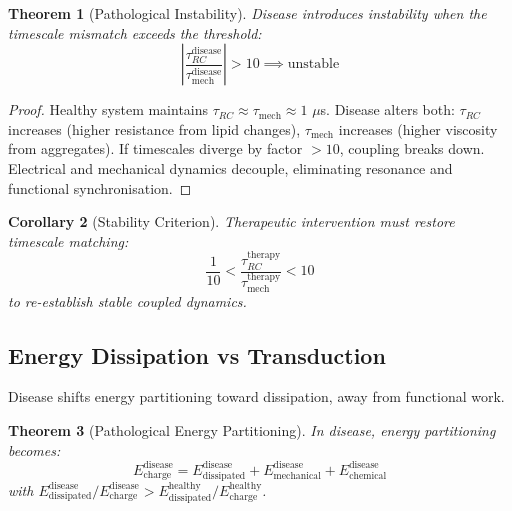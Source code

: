 \documentclass[11pt,twocolumn,a4paper]{article}
\newtheorem{theorem}{Theorem}[section]
\newtheorem{corollary}[theorem]{Corollary}
\theoremstyle{definition}
\theoremstyle{remark}
\begin{document}
\begin{theorem}[Pathological Instability]
\label{thm:pathological_instability}
Disease introduces instability when the timescale mismatch exceeds the threshold:
\begin{equation}
\left|\frac{\tau_{RC}^{\text{disease}}}{\tau_{\text{mech}}^{\text{disease}}}\right| > 10 \implies \text{unstable}
\end{equation}
\end{theorem}

\begin{proof}
Healthy system maintains $\tau_{RC} \approx \tau_{\text{mech}} \approx 1$ $\mu$s. Disease alters both: $\tau_{RC}$ increases (higher resistance from lipid changes), $\tau_{\text{mech}}$ increases (higher viscosity from aggregates). If timescales diverge by factor $>10$, coupling breaks down. Electrical and mechanical dynamics decouple, eliminating resonance and functional synchronisation.
\end{proof}

\begin{corollary}[Stability Criterion]
\label{cor:stability_criterion}
Therapeutic intervention must restore timescale matching:
\begin{equation}
\frac{1}{10} < \frac{\tau_{RC}^{\text{therapy}}}{\tau_{\text{mech}}^{\text{therapy}}} < 10
\end{equation}
to re-establish stable coupled dynamics.
\end{corollary}

\subsection{Energy Dissipation vs Transduction}

Disease shifts energy partitioning toward dissipation, away from functional work.

\begin{theorem}[Pathological Energy Partitioning]
\label{thm:pathological_partitioning}
In disease, energy partitioning becomes:
\begin{equation}
E_{\text{charge}}^{\text{disease}} = E_{\text{dissipated}}^{\text{disease}} + E_{\text{mechanical}}^{\text{disease}} + E_{\text{chemical}}^{\text{disease}}
\end{equation}
with $E_{\text{dissipated}}^{\text{disease}}/E_{\text{charge}}^{\text{disease}} > E_{\text{dissipated}}^{\text{healthy}}/E_{\text{charge}}^{\text{healthy}}$.
\end{theorem}
\end{document}
